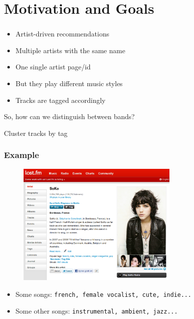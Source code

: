 \documentclass[slidestop,compress,mathserif,serif,notes=show]{beamer}
\title{\docTitle}
\begin{document}
  


  \section{Motivation and Goals}
  \begin{frame}
    \frametitle{\secname}
    \vspace*{0.5cm}
    \begin{itemize}
      \item{}
      Artist-driven recommendations
      \item{}
      Multiple artists with the same name
      \item{}
      One single artist page/id
      \item{}
      But they play different music styles
      \item{}
      Tracks are tagged accordingly
    \end{itemize}

    \bigskip
    So, how can we distinguish between bands?\\
    \pause
    \medskip
    \begin{center}
    \large{Cluster tracks by tag}
    \end{center}
  \end{frame}

  \begin{frame}
    \frametitle{Example}
    \vspace*{0.5cm}
    \begin{figure}
      \centering 
      \includegraphics[width=0.7\textwidth]{figs/soko.pdf} 
      \label{fig:soko} 
    \end{figure}
    \begin{itemize}
      \item{}
      Some songs: \texttt{french, female vocalist, cute, indie...}
      \item{}
      Some other songs: \texttt{instrumental, ambient, jazz...}
    \end{itemize}
  \end{frame}
\end{document}
